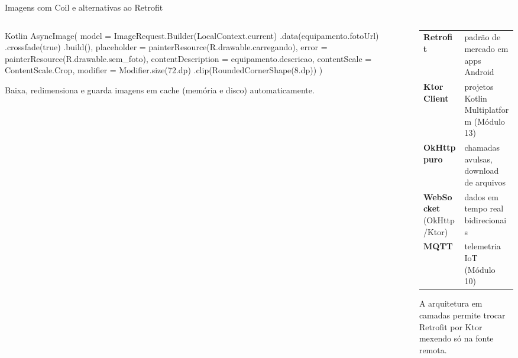 \documentclass[aspectratio=169,10pt]{beamer}
\begin{document}
\begin{frame}[fragile]{Imagens com Coil e alternativas ao Retrofit}
  \begin{columns}[T]
    \begin{column}{0.5\textwidth}
\begin{codigo}[title=Coil em Compose]{Kotlin}
AsyncImage(
  model = ImageRequest.Builder(LocalContext.current)
    .data(equipamento.fotoUrl)
    .crossfade(true)
    .build(),
  placeholder = painterResource(R.drawable.carregando),
  error = painterResource(R.drawable.sem_foto),
  contentDescription = equipamento.descricao,
  contentScale = ContentScale.Crop,
  modifier = Modifier.size(72.dp)
    .clip(RoundedCornerShape(8.dp))
)
\end{codigo}
      \begin{conceito}[Coil]
        Baixa, redimensiona e guarda imagens em cache (memória e disco) automaticamente.
      \end{conceito}
    \end{column}
    \begin{column}{0.48\textwidth}
      \scriptsize
      \begin{tabularx}{\linewidth}{@{}l L@{}}
        \toprule
         &  \\
        \midrule
        \textbf{Retrofit} & padrão de mercado em apps Android \\
        \textbf{Ktor Client} & projetos Kotlin Multiplatform (Módulo 13) \\
        \textbf{OkHttp puro} & chamadas avulsas, download de arquivos \\
        \textbf{WebSocket} (OkHttp/Ktor) & dados em tempo real bidirecionais \\
        \textbf{MQTT} & telemetria IoT (Módulo 10) \\
        \bottomrule
      \end{tabularx}
      \begin{dica}
        A arquitetura em camadas permite trocar Retrofit por Ktor mexendo só na fonte remota.
      \end{dica}
    \end{column}
  \end{columns}
\end{frame}
\end{document}
